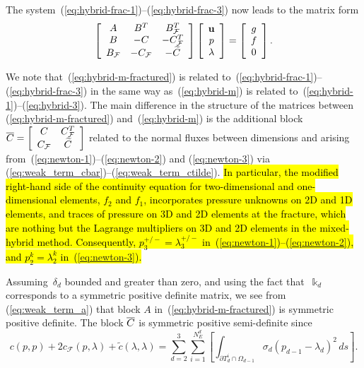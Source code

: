 The system~(\ref{eq:hybrid-frac-1})--(\ref{eq:hybrid-frac-3}) now leads to the
matrix form
\begin{equation}
\left[
\begin{array}
[c]{ccc}%
A & B^{T} & B_{\mathcal{F}}^{T}\\
B & -C & -C_{\mathcal{F}}^{T}\\
B_{\mathcal{F}} & -C_{\mathcal{F}} & -\widetilde{C}%
\end{array}
\right]  \left[
\begin{array}
[c]{c}%
\mathbf{u}\\
p\\
\lambda
\end{array}
\right]  =\left[
\begin{array}
[c]{c}%
g\\
f\\
0
\end{array}
\right]  . \label{eq:hybrid-m-fractured}%
\end{equation}


We note that~(\ref{eq:hybrid-m-fractured}) is related
to~(\ref{eq:hybrid-frac-1})--(\ref{eq:hybrid-frac-3}) in the same way
as~(\ref{eq:hybrid-m}) is related to~(\ref{eq:hybrid-1})--(\ref{eq:hybrid-3}).
The main difference in the structure of the matrices
between (\ref{eq:hybrid-m-fractured}) and~(\ref{eq:hybrid-m}) is the additional
block $\ol{C}=\left[
\begin{array}
[c]{cc}%
C & C_{\mathcal{F}}^{T}\\
C_{\mathcal{F}} & \widetilde{C}%
\end{array}
\right]  $ related to the normal fluxes between dimensions and arising
from~(\ref{eq:newton-1})--(\ref{eq:newton-2}) and (\ref{eq:newton-3}) via
(\ref{eq:weak_term_cbar})--(\ref{eq:weak_term_ctilde}).
\hl{
In particular, 
the modified right-hand side of the continuity equation for two-dimensional and one-dimensional  
elements, $f_{2}$ and $f_{1}$, incorporates pressure unknowns on 2D and 1D  elements, 
and traces of pressure on 3D and 2D elements at the fracture, 
which are nothing but the Lagrange multipliers on 3D and 2D elements in the mixed-hybrid method.
Consequently, 
$p_{3}^{+/-} = \lambda_{3}^{+/-}$ in~(\ref{eq:newton-1})--(\ref{eq:newton-2}), and $p_{2}^{k} = \lambda_{2}^{k}$ in~(\ref{eq:newton-3}).
}

Assuming~$\delta_{d}$ bounded and greater than zero, and using the fact
that~$\Bbbk_{d}$ corresponds to a symmetric positive definite matrix, we see
from (\ref{eq:weak_term_a}) that block $A$ in~(\ref{eq:hybrid-m-fractured}) is
symmetric positive definite. The block $\overline{C}$ is symmetric positive semi-definite
since
\begin{equation}
\label{eq:C_semi_definite}c(p,p) + 2c_{\mathcal{F}}(p,\lambda) +
\widetilde{c}(\lambda, \lambda) = \sum_{d=2}^{3}\sum_{i=1}^{N_{E}^{d}}\left[
\int_{\partial T_{d}^{i} \cap\Omega_{d-1}} \sigma_{d} (p_{d-1} - \lambda
_{d})^{2} \,ds \right]  .
\end{equation}

